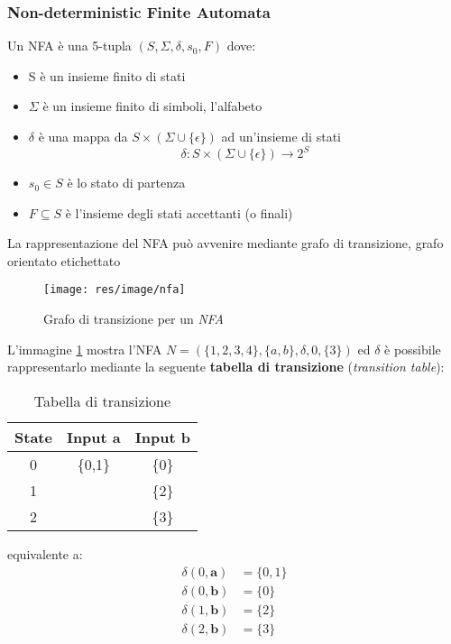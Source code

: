 \subsubsection{Non-deterministic Finite Automata}
\begin{definition}
Un NFA è una 5-tupla $(S,\Sigma,\delta,s_0,F)$ dove:
\begin{itemize}
\item S è un insieme finito di stati
\item $\Sigma$ è un insieme finito di simboli, l'alfabeto
\item $\delta$ è una mappa da $S \times (\Sigma \cup \{\epsilon\})$ ad
un'insieme di stati
$$\delta : S \times (\Sigma \cup \{\epsilon\}) \to 2^S$$
\item $s_0 \in S$ è lo stato di partenza
\item $F \subseteq S$ è l'insieme degli stati accettanti (o finali)
\end{itemize}
\end{definition}

La rappresentazione del NFA può avvenire mediante grafo di transizione,
grafo orientato etichettato

\begin{figure}[H]
\texttt{[image: res/image/nfa]}
\caption{Grafo di transizione per un \textit{NFA}}
\label{img:nfa}
\end{figure}

L'immagine \ref{img:nfa} mostra l'NFA $N=(\{1,2,3,4\},\{a,b\},\delta,0,\{3\})$
ed $\delta$ è possibile rappresentarlo mediante la seguente
\textbf{tabella di transizione} (\textit{transition table}):

\begin{table}[H]
\begin{center}
\begin{tabular}{|c|c|c|}
\hline
State & Input \textbf{a} & Input \textbf{b} \\ \hline
0 & \{0,1\} & \{0\} \\ \hline
1 & & \{2\} \\ \hline
2 & & \{3\} \\ \hline
\end{tabular}
\end{center}
\caption{Tabella di transizione}
\label{tab:transition_table}
\end{table}

equivalente a:
\begin{align*}
\delta(0,\textbf{a}) &= \{0,1\} \\
\delta(0,\textbf{b}) &= \{0\}   \\
\delta(1,\textbf{b}) &= \{2\}   \\
\delta(2,\textbf{b}) &= \{3\}
\end{align*}

